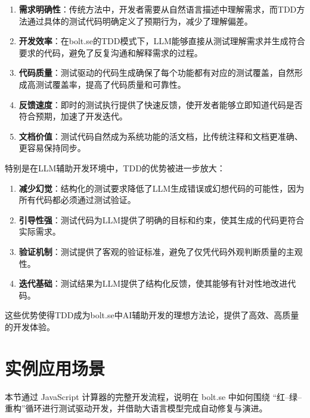 \begin{enumerate}
  \item \textbf{需求明确性}：传统方法中，开发者需要从自然语言描述中理解需求，而TDD方法通过具体的测试代码明确定义了预期行为，减少了理解偏差。
  
  \item \textbf{开发效率}：在bolt.se的TDD模式下，LLM能够直接从测试理解需求并生成符合要求的代码，避免了反复沟通和解释需求的过程。
  
  \item \textbf{代码质量}：测试驱动的代码生成确保了每个功能都有对应的测试覆盖，自然形成高测试覆盖率，提高了代码质量和可靠性。
  
  \item \textbf{反馈速度}：即时的测试执行提供了快速反馈，使开发者能够立即知道代码是否符合预期，加速了开发迭代。
  
  \item \textbf{文档价值}：测试代码自然成为系统功能的活文档，比传统注释和文档更准确、更容易保持同步。
\end{enumerate}

特别是在LLM辅助开发环境中，TDD的优势被进一步放大：

\begin{enumerate}
  \item \textbf{减少幻觉}：结构化的测试要求降低了LLM生成错误或幻想代码的可能性，因为所有代码都必须通过测试验证。
  
  \item \textbf{引导性强}：测试代码为LLM提供了明确的目标和约束，使其生成的代码更符合实际需求。
  
  \item \textbf{验证机制}：测试提供了客观的验证标准，避免了仅凭代码外观判断质量的主观性。
  
  \item \textbf{迭代基础}：测试结果为LLM提供了结构化反馈，使其能够有针对性地改进代码。
\end{enumerate}

这些优势使得TDD成为bolt.se中AI辅助开发的理想方法论，提供了高效、高质量的开发体验。

\section{实例应用场景}
\label{sec:tdd-example}

本节通过 JavaScript 计算器的完整开发流程，说明在 bolt.se 中如何围绕
“红–绿–重构”循环进行测试驱动开发，并借助大语言模型完成自动修复与演进。

